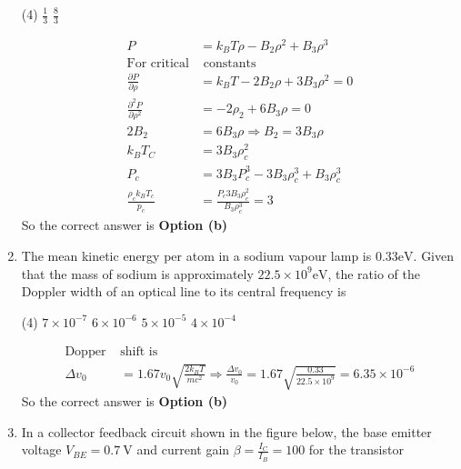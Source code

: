 \begin{enumerate}
 \begin{tasks}(4)
	\task[\textbf{a.}]$\frac{1}{3}$
	\task[\textbf{c.}]$\frac{8}{3}$
\end{tasks}
\begin{answer}
	\begin{align*}
	P&=k_{B} T \rho-B_{2} \rho^{2}+B_{3} \rho^{3}\\
	\text{For critical}&\text{ constants}\\
	\frac{\partial P}{\partial \rho}&=k_{B} T-2 B_{2} \rho+3 B_{3} \rho^{2}=0 \\
	\frac{\partial^{2} P}{\partial \rho^{2}}&=-2 \rho_{2}+6 B_{3} \rho=0 \\
	2 B_{2}&=6 B_{3} \rho \Rightarrow B_{2}=3 B_{3} \rho \\
	k_{B} T_{C}&=3 B_{3} \rho_{c}^{2} \\
	P_{c}&=3 B_{3} P_{c}^{3}-3 B_{3} \rho_{c}^{3}+B_{3} \rho_{c}^{3}\\
	\frac{\rho_{c} k_{B} T_{c}}{p_{c}}&=\frac{P_{c} 3 B_{3} \rho_{c}^{2}}{B_{3} \rho_{c}^{3}}=3
	\end{align*}
		So the correct answer is \textbf{Option (b)}
\end{answer}
\item The mean kinetic energy per atom in a sodium vapour lamp is $0.33 \mathrm{eV}$. Given that the mass of sodium is approximately $22.5 \times 10^{9} \mathrm{eV}$, the ratio of the Doppler width of an optical line to its central frequency is
 \begin{tasks}(4)
	\task[\textbf{a.}]$7 \times 10^{-7}$
	\task[\textbf{b.}]$6 \times 10^{-6}$
	\task[\textbf{c.}]$5 \times 10^{-5}$
	\task[\textbf{d.}]$4 \times 10^{-4}$ 
\end{tasks}
\begin{answer}
	\begin{align*}
	\text{Dopper }&\text{shift is}\\
	\Delta v_{0}&=1.67 v_{0} \sqrt{\frac{2 k_{B} T}{m c^{2}}} \Rightarrow \frac{\Delta v_{0}}{v_{0}}=1.67 \sqrt{\frac{0.33}{22.5 \times 10^{9}}}=6.35 \times 10^{-6}
	\end{align*}
	So the correct answer is \textbf{Option (b)}
\end{answer}
\item  In a collector feedback circuit shown in the figure below, the base emitter voltage $V_{B E}=0.7 \mathrm{~V}$ and current gain $\beta=\frac{I_{C}}{I_{B}}=100$ for the transistor
\begin{figure}[H]
	\centering

\end{figure}
\end{enumerate}
